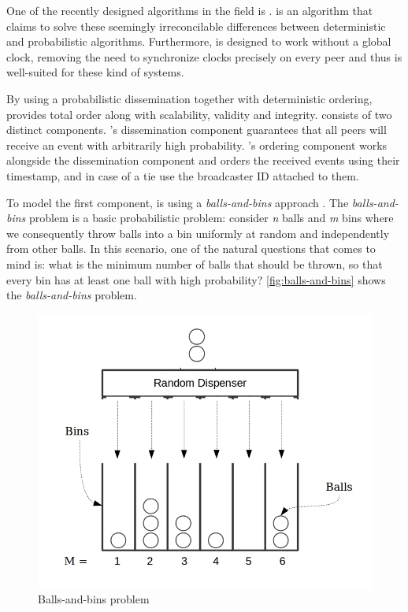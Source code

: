 One of the recently designed algorithms in the field is \epto \autocite{matos2015epto}. \epto is an algorithm that claims to solve these seemingly irreconcilable
differences between deterministic and probabilistic algorithms. Furthermore, \epto is designed to work without a global clock, removing the need to synchronize clocks precisely on every peer and thus is well-suited for these kind of systems.
\par
By using a probabilistic dissemination together with deterministic ordering, \epto provides total order along with scalability, validity and integrity. \epto consists of two distinct components. \epto's dissemination component guarantees that all peers will receive an event with arbitrarily high probability. \epto's ordering component works alongside the dissemination component and orders the received events using their timestamp, and in case of a tie use the broadcaster ID attached to them.
\par
To model the first component, \epto is using a \textit{balls-and-bins} approach \autocite{Koldehofe02simplegossiping}. The \textit{balls-and-bins} problem is a basic probabilistic problem: consider \textit{n} balls and \textit{m} bins where we consequently throw balls into a bin uniformly at random and independently from other balls. In this scenario, one of the natural questions that comes to mind is: what is the minimum number of balls that should be thrown, so that every bin has at least one ball with high probability? \autoref{fig:balls-and-bins} shows the \textit{balls-and-bins} problem.
\begin{figure}
	\includegraphics[width=\linewidth]{figures/BnB.jpeg}
	\caption[Caption]{Balls-and-bins problem\footnotemark}
	\label{fig:balls-and-bins}
\end{figure}
